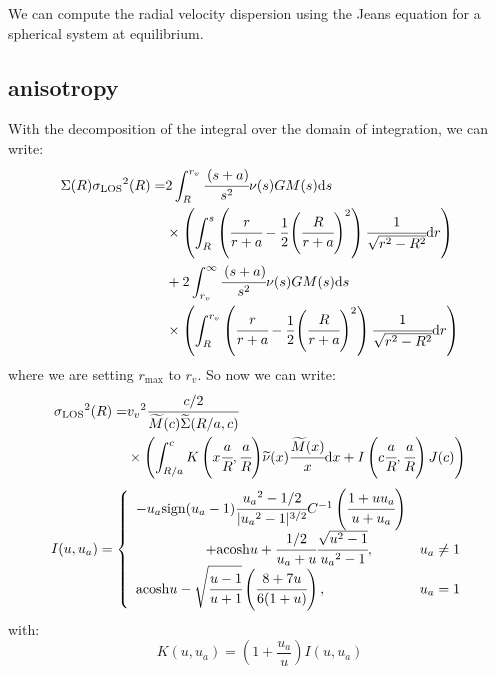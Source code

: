 We can compute the radial velocity dispersion using the Jeans equation for a
spherical system at equilibrium.

\subsection{\citet{ML+05} anisotropy}

With the decomposition of the integral over the domain of integration, we can
write:
%
\begin{align}
    \Sigma{(R)}{\sigma_\mathrm{LOS}}^2{(R)}=&
        2\int_R^{r_v}{\cfrac{\left({s+a}\right)}{s^2}{\nu(s)}{G}{M(s)}}{{\rm{d}}{s}}
        \nonumber\\
    &\times
        \left(\int_R^s{\left(\cfrac{r}{r+a}-\frac{1}{2}
        {\left(\cfrac{R}{r+a}\right)}^2\right)
        \cfrac{1}{\sqrt{r^2-R^2}}{\rm{d}}{r}}\right)\nonumber\\
    &+2\int_{r_v}^{\infty}
        \cfrac{\left({s+a}\right)}{s^2}\nu(s){G}{M(s)}{\rm{d}}{s}\nonumber\\
    &\times
        \left(\int_R^{r_v}
            \left(\cfrac{r}{r+a}-\frac{1}{2}{\left(\cfrac{R}{r+a}\right)}^2\right)
            \cfrac{1}{\sqrt{r^2-R^2}}{\rm{d}}{r}\right)
\end{align}
%
where we are setting $r_{\max}$ to $r_v$. So now we can write:
%
\begin{align}
    {\sigma_\mathrm{LOS}}^2{(R)}=&{v_v}^2\cfrac{c/2}{\widetilde{M}{(c)}\widetilde{\Sigma}{(R/a,c)}}\nonumber\\
    &\times\left(\int_{R/a}^c{{K}\left({x\cfrac{a}{R},\cfrac{a}{R}}\right)}\widetilde{\nu}{(x)}
    \cfrac{\widetilde{M}{(x)}}{x}{\rm{d}}{x}+I\left({c\cfrac{a}{R},\cfrac{a}{R}}\right){J(c)}\right)
\end{align}
%
\begin{equation}
    I(u,u_a)=\left\{\begin{array}{lr}
        -u_a{\rm{sign}}(u_a-1)\cfrac{{u_a}^2-1/2}{|{u_a}^2-1|^{3/2}}{C^{-1}\left(\cfrac{1+u{u_a}}{u+u_a}\right)}&\\
        \hspace{5em}+{\rm{acosh}}{u}+\cfrac{1/2}{u_a+u}\cfrac{\sqrt{u^2-1}}{{u_a}^2-1},&{u_a}\neq1\\
        {\rm{acosh}}{u}-\sqrt{\cfrac{u-1}{u+1}}\left(\cfrac{8+7u}{6(1+u)}\right),&{u_a}=1\\
    \end{array}\right.
\end{equation}
%
with:
%
\begin{equation}
    K(u,u_a)=\left({1+\frac{u_a}{u}}\right){I(u,u_a)}
\end{equation}
